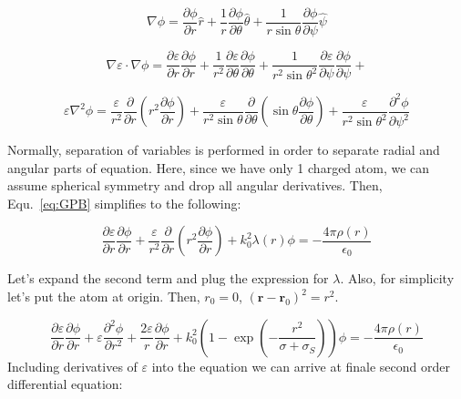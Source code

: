 \documentclass{article}
\begin{document}
\begin{equation}
  \label{eq:DelPhi}
    \nabla \phi = \frac{\partial \phi}{\partial r} \hat{r} +
    \frac{1}{r} \frac{\partial \phi}{\partial \theta} \hat{\theta} +
    \frac{1}{r \sin{\theta}} \frac{\partial \phi}{\partial \psi} \hat{\psi} 
\end{equation}


\begin{equation}
  \label{eq:DelPhiDotDelEps}
    \nabla \varepsilon \cdot \nabla \phi  = \frac{\partial \varepsilon}{\partial r}
    \frac{\partial \phi}{\partial r} +
    \frac{1}{r^2} \frac{\partial \varepsilon}{\partial \theta}
    \frac{\partial \phi}{\partial \theta} +
    \frac{1}{r^2 \sin{\theta}^2} \frac{\partial \varepsilon}{\partial \psi} 
    \frac{\partial \phi}{\partial \psi} +
\end{equation}

\begin{equation}
  \label{eq:EpsNableSquarePhi}
    \varepsilon \nabla^2 \phi  = \frac{\varepsilon}{r^2} \frac{\partial }{\partial r}
    \left( r^2 \frac{\partial \phi}{\partial r} \right) +
    \frac{\varepsilon}{r^2 \sin{\theta}} \frac{\partial}{\partial \theta}
    \left( \sin{\theta} \frac{\partial \phi}{\partial \theta} \right) +
    \frac{\varepsilon}{r^2 \sin{\theta}^2} 
    \frac{\partial^2 \phi}{\partial \psi^2}
\end{equation}

Normally, separation of variables is performed in order to separate radial and angular parts of
equation. Here, since we have only 1 charged atom, we can assume spherical symmetry and drop all
angular derivatives. Then, Equ.~\ref{eq:GPB} simplifies to the following:

\begin{equation}
    \label{eq:PB1}
        \frac{\partial \varepsilon}{\partial r} \frac{\partial \phi}{\partial r} +
        \frac{\varepsilon}{r^2} \frac{\partial}{\partial r}
        \left( r^2 \frac{\partial \phi}{\partial r}\right)
        + k_{0}^{2} \lambda(r) \phi = -\frac{4\pi \rho(r)}{\epsilon_0}
\end{equation}

Let's expand the second term and plug the expression for $\lambda$. Also, for simplicity
let's put the atom at origin. Then,  $r_0=0$,  $(\mathbf{r} - \mathbf{r}_0)^2 = r^2 $.

\begin{equation}
    \label{eq:PB2}
        \frac{\partial \varepsilon}{\partial r} \frac{\partial \phi}{\partial r} +
        \varepsilon \frac{\partial^2 \phi}{\partial r^2} +
        \frac{2\varepsilon}{r} \frac{\partial \phi}{\partial r} +
        k_{0}^{2} \left( 1 - \exp \left(- \frac{r^2 }{\sigma + \sigma_S} \right) \right) \phi = -\frac{4\pi \rho(r)}{\epsilon_0}
\end{equation}
Including derivatives of $\varepsilon$ into the equation we can arrive at finale second order differential equation:
\end{document}
